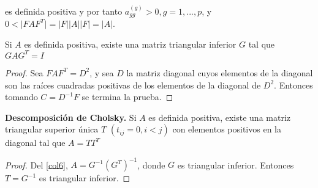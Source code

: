 es definida positiva y por tanto $a_{gg}^{(g)}>0, g=1,...,p$, y $0 < \vert FAF^T \vert = \vert F \vert \vert A \vert \vert F \vert = \vert A \vert$.
\begin{corolario}\label{col6}
Si $A$ es definida positiva, existe una matriz triangular inferior $G$ tal que $GAG^T=I$
\end{corolario}
\begin{proof}
Sea $FAF^T=D^2$, y sea $D$ la matriz diagonal cuyos elementos de la diagonal son las raíces cuadradas positivas de los elementos de la diagonal de $D^2$. Entonces tomando $C=D^{-1}F$ se termina la prueba.
\end{proof}
\begin{corolario}
\textbf{Descomposición de Cholsky.} Si $A$ es definida positiva, existe una matriz triangular superior única $T$ $(t_{ij}=0, i<j)$ con elementos positivos en la diagonal tal que $A=TT^T$
\end{corolario}
\begin{proof}
Del \autoref{col6}, $A=G^{-1}(G^{T})^{-1}$, donde $G$ es triangular inferior. Entonces $T=G^{-1}$ es triangular inferior.
\end{proof}
\cite{anderson1958introduction}\\
